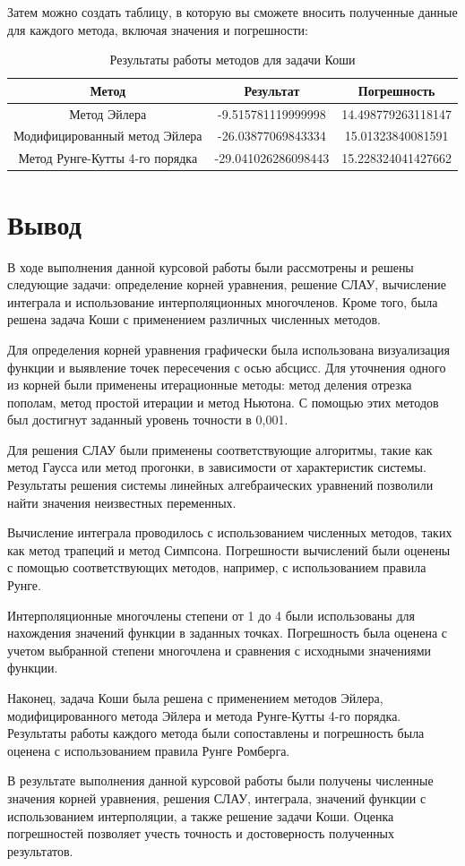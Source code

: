 \documentclass[12pt]{article}
\begin{document}
Затем можно создать таблицу, в которую вы сможете вносить полученные данные для каждого метода, включая значения и погрешности:

\clearpage

\begin{table}[ht]
\centering
\begin{tabular}{|c|c|c|}
\hline
\textbf{Метод} & \textbf{Результат} & \textbf{Погрешность} \\   
\hline
Метод Эйлера &-9.515781119999998 & 14.498779263118147\\
\hline
Модифицированный метод Эйлера &-26.03877069843334 & 15.01323840081591 \\
\hline
Метод Рунге-Кутты 4-го порядка &-29.041026286098443 &15.228324041427662 \\
\hline
\end{tabular}
\caption{Результаты работы методов для задачи Коши}
\end{table}

\section{Вывод}

В ходе выполнения данной курсовой работы были рассмотрены и решены следующие задачи: определение корней уравнения, решение СЛАУ, вычисление интеграла и использование интерполяционных многочленов. Кроме того, была решена задача Коши с применением различных численных методов.

Для определения корней уравнения графически была использована визуализация функции и выявление точек пересечения с осью абсцисс. Для уточнения одного из корней были применены итерационные методы: метод деления отрезка пополам, метод простой итерации и метод Ньютона. С помощью этих методов был достигнут заданный уровень точности в 0,001.

Для решения СЛАУ были применены соответствующие алгоритмы, такие как метод Гаусса или метод прогонки, в зависимости от характеристик системы. Результаты решения системы линейных алгебраических уравнений позволили найти значения неизвестных переменных.

Вычисление интеграла проводилось с использованием численных методов, таких как метод трапеций и метод Симпсона. Погрешности вычислений были оценены с помощью соответствующих методов, например, с использованием правила Рунге.

Интерполяционные многочлены степени от 1 до 4 были использованы для нахождения значений функции в заданных точках. Погрешность была оценена с учетом выбранной степени многочлена и сравнения с исходными значениями функции.

Наконец, задача Коши была решена с применением методов Эйлера, модифицированного метода Эйлера и метода Рунге-Кутты 4-го порядка. Результаты работы каждого метода были сопоставлены и погрешность была оценена с использованием правила Рунге Ромберга.

В результате выполнения данной курсовой работы были получены численные значения корней уравнения, решения СЛАУ, интеграла, значений функции с использованием интерполяции, а также решение задачи Коши. Оценка погрешностей позволяет учесть точность и достоверность полученных результатов.
\end{document}
